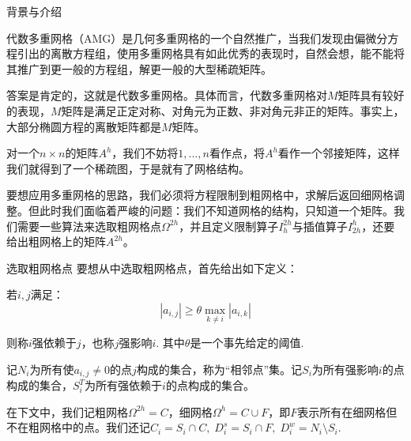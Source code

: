\documentclass[9pt]{beamer}
\begin{document}
\begin{frame}{背景与介绍}

代数多重网格（AMG）是几何多重网格的一个自然推广，当我们发现由偏微分方程引出的离散方程组，使用多重网格具有如此优秀的表现时，自然会想，能不能将其推广到更一般的方程组，解更一般的大型稀疏矩阵。

\pause
\vspace{1em}
答案是肯定的，这就是代数多重网格。具体而言，代数多重网格对$M$矩阵具有较好的表现，$M$矩阵是满足正定对称、对角元为正数、非对角元非正的矩阵。事实上，大部分椭圆方程的离散矩阵都是$M$矩阵。

\pause
\vspace{1em}
对一个$n\times n$的矩阵$A^h$，我们不妨将$1,...,n$看作点，将$A^h$看作一个邻接矩阵，这样我们就得到了一个稀疏图，于是就有了网格结构。

\pause
\vspace{1em}
要想应用多重网格的思路，我们必须将方程限制到粗网格中，求解后返回细网格调整。但此时我们面临着严峻的问题：我们不知道网格的结构，只知道一个矩阵。我们需要一些算法来选取粗网格点$\Omega^{2h}$，并且定义限制算子$I_{h}^{2h}$与插值算子$I_{2h}^{h}$，还要给出粗网格上的矩阵$A^{2h}$。
\end{frame}

\begin{frame}{选取粗网格点}
要想从中选取粗网格点，首先给出如下定义：

\vspace{1em}
  若$i,j$满足：
  \begin{equation}
    |a_{i,j}|\geq \theta\max_{k\neq i}|a_{i,k}|
  \end{equation}

  则称$i$强依赖于$j$，也称$j$强影响$i$. 其中$\theta$是一个事先给定的阈值.

 \vspace{.5em}
  记$N_i$为所有使$a_{i,j}\neq 0$的点$j$构成的集合，称为“相邻点”集。记$S_i$为所有强影响$i$的点构成的集合，$S_i^T$为所有强依赖于$i$的点构成的集合。

\vspace{1em}
在下文中，我们记粗网格$\Omega^{2h}=C$，细网格$\Omega^h=C\cup F$，即$F$表示所有在细网格但不在粗网格中的点。我们还记$C_i=S_i\cap C,\;D_i^s=S_i\cap F,\;D_i^w=N_i\setminus S_i$.
\end{frame}
\end{document}
